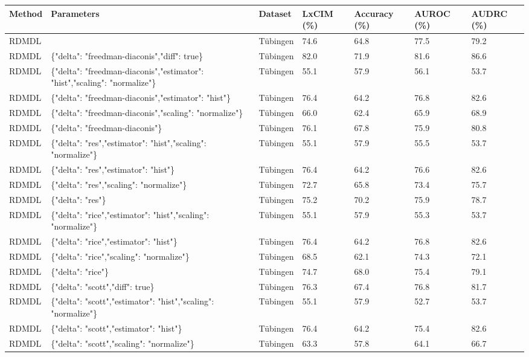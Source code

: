 \begin{tabular}{lllllll}
\toprule
Method & Parameters & Dataset & LxCIM (\%) & Accuracy (\%) & AUROC (\%) & AUDRC (\%) \\
\midrule
RDMDL &  & Tübingen & 74.6 & 64.8 & 77.5 & 79.2 \\
RDMDL & \{"delta": "freedman-diaconis","diff": true\} & Tübingen & 82.0 & 71.9 & 81.6 & 86.6 \\
RDMDL & \{"delta": "freedman-diaconis","estimator": "hist","scaling": "normalize"\} & Tübingen & 55.1 & 57.9 & 56.1 & 53.7 \\
RDMDL & \{"delta": "freedman-diaconis","estimator": "hist"\} & Tübingen & 76.4 & 64.2 & 76.8 & 82.6 \\
RDMDL & \{"delta": "freedman-diaconis","scaling": "normalize"\} & Tübingen & 66.0 & 62.4 & 65.9 & 68.9 \\
RDMDL & \{"delta": "freedman-diaconis"\} & Tübingen & 76.1 & 67.8 & 75.9 & 80.8 \\
RDMDL & \{"delta": "res","estimator": "hist","scaling": "normalize"\} & Tübingen & 55.1 & 57.9 & 55.5 & 53.7 \\
RDMDL & \{"delta": "res","estimator": "hist"\} & Tübingen & 76.4 & 64.2 & 76.6 & 82.6 \\
RDMDL & \{"delta": "res","scaling": "normalize"\} & Tübingen & 72.7 & 65.8 & 73.4 & 75.7 \\
RDMDL & \{"delta": "res"\} & Tübingen & 75.2 & 70.2 & 75.9 & 78.7 \\
RDMDL & \{"delta": "rice","estimator": "hist","scaling": "normalize"\} & Tübingen & 55.1 & 57.9 & 55.3 & 53.7 \\
RDMDL & \{"delta": "rice","estimator": "hist"\} & Tübingen & 76.4 & 64.2 & 76.8 & 82.6 \\
RDMDL & \{"delta": "rice","scaling": "normalize"\} & Tübingen & 68.5 & 62.1 & 74.3 & 72.1 \\
RDMDL & \{"delta": "rice"\} & Tübingen & 74.7 & 68.0 & 75.4 & 79.1 \\
RDMDL & \{"delta": "scott","diff": true\} & Tübingen & 76.3 & 67.4 & 76.8 & 81.7 \\
RDMDL & \{"delta": "scott","estimator": "hist","scaling": "normalize"\} & Tübingen & 55.1 & 57.9 & 52.7 & 53.7 \\
RDMDL & \{"delta": "scott","estimator": "hist"\} & Tübingen & 76.4 & 64.2 & 75.4 & 82.6 \\
RDMDL & \{"delta": "scott","scaling": "normalize"\} & Tübingen & 63.3 & 57.8 & 64.1 & 66.7 \\

\end{tabular}
